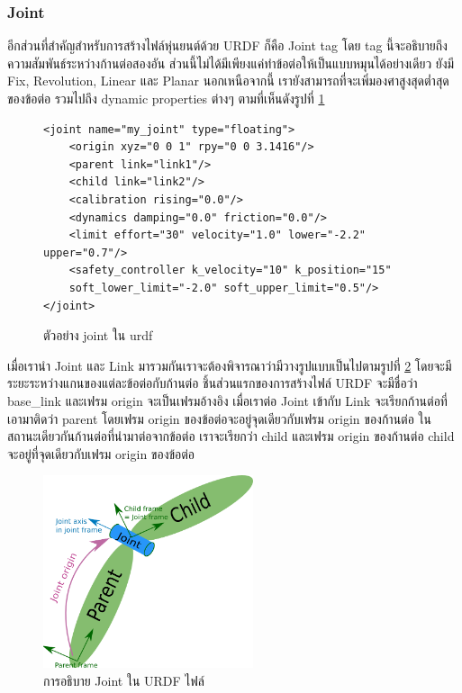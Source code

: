 \subsubsection*{Joint}
อีกส่วนที่สำคัญสำหรับการสร้างไฟล์หุ่นยนต์ด้วย URDF ก็คือ Joint tag โดย tag นี้จะอธิบายถึงความสัมพันธ์ระหว่างก้านต่อสองอัน
ส่วนนี้ไม่ได้มีเพียงแค่ทำข้อต่อให้เป็นแบบหมุนได้อย่างเดียว ยังมี Fix, Revolution, Linear และ Planar นอกเหนือจากนี้
เรายังสามารถที่จะเพิ่มองศาสูงสุดต่ำสุดของข้อต่อ รวมไปถึง dynamic properties ต่างๆ ตามที่เห็นดังรูปที่ \ref{fig:urdf_joint_code}
\begin{figure}[!ht]
\begin{Verbatim}[fontsize=\small]
<joint name="my_joint" type="floating">
	<origin xyz="0 0 1" rpy="0 0 3.1416"/>
	<parent link="link1"/>
	<child link="link2"/>
	<calibration rising="0.0"/>
	<dynamics damping="0.0" friction="0.0"/>
	<limit effort="30" velocity="1.0" lower="-2.2" upper="0.7"/>
	<safety_controller k_velocity="10" k_position="15" 
	soft_lower_limit="-2.0" soft_upper_limit="0.5"/>
</joint>
\end{Verbatim}
\caption{ตัวอย่าง joint ใน urdf}
	\label{fig:urdf_joint_code}
\end{figure}

เมื่อเรานำ Joint และ Link มารวมกันเราจะต้องพิจารณาว่ามีวางรูปแบบเป็นไปตามรูปที่ \ref{fig:urdf_joint}
โดยจะมีระยะระหว่างแกนของแต่ละข้อต่อกับก้านต่อ ชิ้นส่วนแรกของการสร้างไฟล์ URDF จะมีชื่อว่า base\_link
และเฟรม origin จะเป็นเฟรมอ้างอิง เมื่อเราต่อ Joint เข้ากับ Link จะเรียกก้านต่อที่เอามาติดว่า parent
โดยเฟรม origin ของข้อต่อจะอยู่จุดเดียวกับเฟรม origin ของก้านต่อ ในสถานะเดียวกันก้านต่อที่นำมาต่อจากข้อต่อ
เราจะเรียกว่า child และเฟรม origin ของก้านต่อ child จะอยู่ที่จุดเดียวกับเฟรม origin ของข้อต่อ

\begin{figure}[!ht]
	\centering
	\includegraphics[width=0.55\textwidth]{chapter3/images/urdf_joint.png}
	\caption{การอธิบาย Joint ใน URDF ไฟล์}
	\label{fig:urdf_joint}
\end{figure}

